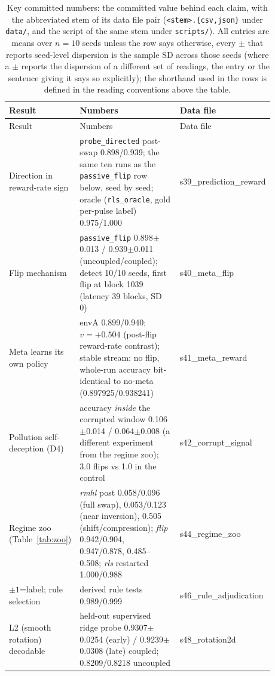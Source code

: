 \documentclass[preprint,12pt]{elsarticle}
\begin{document}
\begin{longtable}{@{}>{\footnotesize}p{0.17\linewidth}>{\footnotesize}p{0.45\linewidth}>{\footnotesize}p{0.26\linewidth}@{}}
\caption{Key committed numbers: the committed value behind each
claim, with the abbreviated stem of its data file pair
(\texttt{<stem>.\{csv,json\}} under \texttt{data/}, and the script of the same
stem under \texttt{scripts/}). All entries are means over $n=10$ seeds unless
the row says otherwise, every $\pm$ that reports seed-level dispersion is the
sample SD across those seeds (where a $\pm$ reports the dispersion of a
different set of readings, the entry or the sentence giving it says so explicitly); the shorthand used in the rows is defined in the reading conventions above the table.}
\label{tab:keynumbers}\\
\toprule
Result & Numbers & Data file \\
\midrule
\endfirsthead
\toprule
Result & Numbers & Data file \\
\midrule
\endhead
\bottomrule
\endlastfoot
Direction in reward-rate sign & \texttt{probe\_directed} post-swap 0.898/0.939; the same ten runs as the \texttt{passive\_flip} row below, seed by seed; oracle (\texttt{rls\_oracle}, gold per-pulse label) 0.975/1.000 & s39\_prediction\_reward \\
Flip mechanism & \texttt{passive\_flip} 0.898$\pm$0.013 / 0.939$\pm$0.011 (uncoupled/coupled); detect 10/10 seeds, first flip at block 1039 (latency 39 blocks, SD 0) & s40\_meta\_flip \\
Meta learns its own policy & envA 0.899/0.940; $v=+0.504$ (post-flip reward-rate contrast); stable stream: no flip, whole-run accuracy bit-identical to no-meta (0.897925/0.938241) & s41\_meta\_reward \\
Pollution self-deception (D4) & accuracy \emph{inside} the corrupted window 0.106$\pm$0.014 / 0.064$\pm$0.008 (a different experiment from the regime zoo); 3.0 flips vs 1.0 in the control & s42\_corrupt\_signal \\
Regime zoo (Table~\ref{tab:zoo}) & \textit{rmhl} post 0.058/0.096 (full swap), 0.053/0.123 (near inversion), 0.505 (shift/compression); \textit{flip} 0.942/0.904, 0.947/0.878, 0.485--0.508; \textit{rls} restarted 1.000/0.988 & s44\_regime\_zoo \\
$\pm1$=label; rule selection & derived rule tests 0.989/0.999 & s46\_rule\_adjudication \\
L2 (smooth rotation) decodable & held-out supervised ridge probe 0.9307$\pm$0.0254 (early) / 0.9239$\pm$0.0308 (late) coupled; 0.8209/0.8218 uncoupled & s48\_rotation2d \\

\end{longtable}
\end{document}
